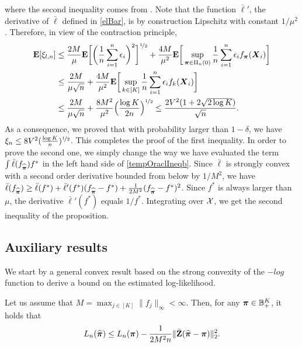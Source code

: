 where the second inequality comes from \citep[Th.\ 11.5]{boucheron2013concentration}.  Note that the function $\bar\ell'$, the derivative of $\bar\ell$ defined in \eqref{elBar},
is by construction Lipschitz with constant $1/\mu^2$. Therefore, in view of the contraction
principle,
\begin{align}
\mathbf E[\xi_{l,n}]
&\le \frac{2M}{\mu}\mathbf E\bigg[\bigg(\frac1n\sum_{i=1}^n \epsilon_i\bigg)^2\bigg]^{\nicefrac12}+
\frac{4M}{\mu^2}\mathbf E\bigg[\sup_{\boldsymbol \pi\in\Pi_n(0)} \frac1n\sum_{i=1}^n
\epsilon_if_{\boldsymbol \pi}(\boldsymbol X_i)\bigg]\\
&\le \frac{2M}{\mu\sqrt{n}}+
\frac{4M}{\mu^2}\mathbf E\bigg[\sup_{k\in[K]} \frac1n\sum_{i=1}^n
\epsilon_i f_k(\boldsymbol X_i)\bigg]\\
&\le \frac{2M}{\mu\sqrt{n}}+
\frac{8M^2}{\mu^2}\Big(\frac{\log K}{2n}\Big)^{\nicefrac12} \le \frac{2V^2(1+2\sqrt{2\log K})}{\sqrt{n}}.
\end{align}
As a consequence, we proved that with probability larger than $1-\delta$, we have
$\xi_n\le 8V^2(\frac{\log K}{n})^{\nicefrac12}$. This completes the proof of the first inequality.
In order to prove the second one, we simply change the way we have evaluated the term
$\int \bar\ell(f_{\widehat{\boldsymbol \pi}})f^*$ in the left hand side of \eqref{tempOraclIneqb}. Since
$\bar\ell$ is strongly convex with a second order derivative bounded from below by $1/M^2$, we
have $\bar\ell(f_{\widehat{\boldsymbol \pi}})\ge \bar\ell(f^*) + \bar\ell'(f^*)(f_{\widehat{\boldsymbol \pi}}-f^*)+
\frac1{2M^2}(f_{\widehat{\boldsymbol \pi}}-f^*)^2$. Since $f^*$ is always larger than $\mu$, the derivative
$\bar\ell'(f^*)$ equals $1/f^*$. Integrating over $\mathcal X$, we get the second inequality of
the proposition.


\subsection{Auxiliary results}\label{ssec:auxiliary}


We start by a general convex result based on the strong convexity of the $-log$ function to
derive a bound on the estimated log-likelihood.
\begin{lemma}{}
	\label{convexlemma}
	Let us assume that $M =\max_{j\in[K]}\|f_j\|_\infty<\infty$. Then, for any $\boldsymbol \pi\in {\mathbb B}^K_+$, it holds that
	\begin{equation}
	L_n(\widehat{\boldsymbol \pi}) \le L_n(\boldsymbol \pi) -\frac1{2M^2n}\|\bar{\mathbf Z}(\widehat{\boldsymbol \pi}-\boldsymbol \pi)\|_2^2.
	\end{equation}
\end{lemma}

